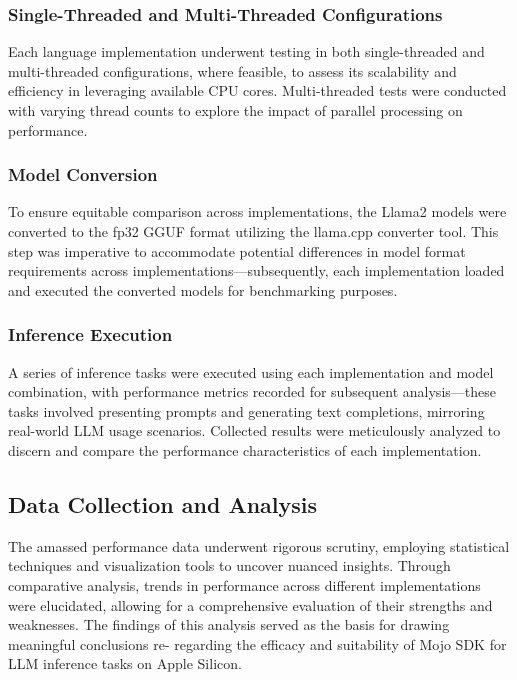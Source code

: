 \documentclass[conference]{IEEEtran}
\begin{document}
\subsubsection{Single-Threaded and Multi-Threaded Configurations}
Each language implementation underwent testing in both single-threaded and multi-threaded configurations, where feasible, to assess its scalability and efficiency in leveraging available CPU cores. Multi-threaded tests were conducted with varying thread counts to explore the impact of parallel processing on performance.

\subsubsection{Model Conversion}
To ensure equitable comparison across implementations, the Llama2 models were converted to the fp32 GGUF format utilizing the llama.cpp converter tool. This step was imperative to accommodate potential differences in model format requirements across implementations—subsequently, each implementation loaded and executed the converted models for benchmarking purposes.

\subsubsection{Inference Execution}
A series of inference tasks were executed using each implementation and model combination, with performance metrics recorded for subsequent analysis—these tasks involved presenting prompts and generating text completions, mirroring real-world LLM usage scenarios. Collected results were meticulously analyzed to discern and compare the performance characteristics of each implementation.


\subsection{Data Collection and Analysis}
The amassed performance data underwent rigorous scrutiny, employing statistical techniques and visualization tools to uncover nuanced insights. Through comparative analysis, trends in performance across different implementations were elucidated, allowing for a comprehensive evaluation of their strengths and weaknesses. The findings of this analysis served as the basis for drawing meaningful conclusions re- regarding the efficacy and suitability of Mojo SDK for LLM inference tasks on Apple Silicon.
\end{document}

